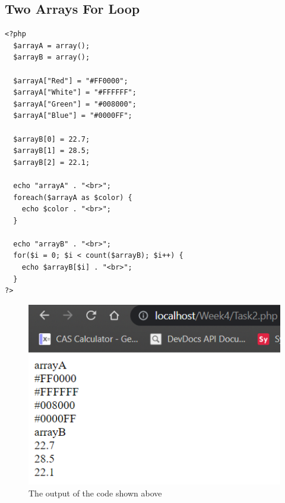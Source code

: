 \documentclass{article}
\begin{document}
        \subsection{Two Arrays For Loop}
            \begin{verbatim}
<?php
  $arrayA = array();
  $arrayB = array();
  
  $arrayA["Red"] = "#FF0000";
  $arrayA["White"] = "#FFFFFF";
  $arrayA["Green"] = "#008000";
  $arrayA["Blue"] = "#0000FF";
  
  $arrayB[0] = 22.7;
  $arrayB[1] = 28.5;
  $arrayB[2] = 22.1;
  
  echo "arrayA" . "<br>";
  foreach($arrayA as $color) {
    echo $color . "<br>";
  }
  
  echo "arrayB" . "<br>";
  for($i = 0; $i < count($arrayB); $i++) {
    echo $arrayB[$i] . "<br>";
  }
?>
            \end{verbatim}
            \begin{figure}[h]
                \centering
                \includegraphics[width=1.0\textwidth]{Task2C}
                \caption{The output of the code shown above}
            \end{figure}
        
\end{document}

